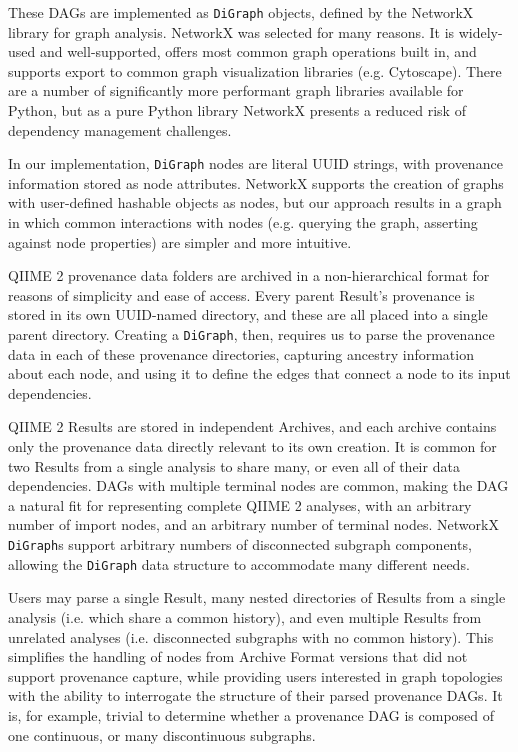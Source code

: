 These DAGs are implemented as \texttt{DiGraph} objects, defined by the NetworkX library
for graph analysis. NetworkX was selected for many reasons. It is widely-used
and well-supported, offers most common graph operations built in, and supports
export to common graph visualization libraries (e.g. Cytoscape). There are a
number of significantly more performant graph libraries available for Python,
but as a pure Python library NetworkX presents a reduced risk of dependency
management challenges.

In our implementation, \texttt{DiGraph} nodes are literal UUID strings, with provenance
information stored as node attributes. NetworkX supports the creation of graphs
with user-defined hashable objects as nodes, but our approach results in a graph
in which common interactions with nodes (e.g. querying the graph, asserting
against node properties) are simpler and more intuitive.

QIIME 2 provenance data folders are archived in a non-hierarchical format for
reasons of simplicity and ease of access. Every parent Result’s provenance is
stored in its own UUID-named directory, and these are all placed into a single
parent directory. Creating a \texttt{DiGraph}, then, requires us to parse the provenance
data in each of these provenance directories, capturing ancestry information
about each node, and using it to define the edges that connect a node to its
input dependencies.

QIIME 2 Results are stored in independent Archives, and each archive contains
only the provenance data directly relevant to its own creation. It is common for
two Results from a single analysis to share many, or even all of their data
dependencies. DAGs with multiple terminal nodes are common, making the DAG a
natural fit for representing complete QIIME 2 analyses, with an arbitrary number
of import nodes, and an arbitrary number of terminal nodes. NetworkX \texttt{DiGraph}s
support arbitrary numbers of disconnected subgraph components, allowing the
\texttt{DiGraph} data structure to accommodate many different needs.

Users may parse a single Result, many nested directories of Results from a
single analysis (i.e. which share a common history), and even multiple Results
from unrelated analyses (i.e. disconnected subgraphs with no common history).
This simplifies the handling of nodes from Archive Format versions that did not
support provenance capture, while providing users interested in graph topologies
with the ability to interrogate the structure of their parsed provenance DAGs.
It is, for example, trivial to determine whether a provenance DAG is composed of
one continuous, or many discontinuous subgraphs.


